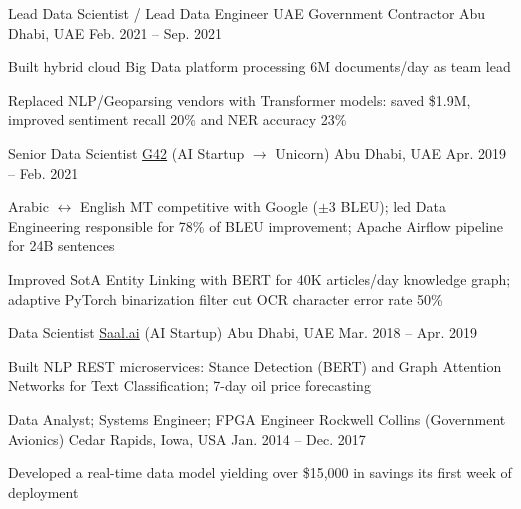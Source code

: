 \begin{cventries}
  \cventry
    {Lead Data Scientist / Lead Data Engineer} %
    {UAE Government Contractor} %
    {Abu Dhabi, UAE} %
    {Feb. 2021 -- Sep. 2021} %
    {
      \begin{cvitems} %
        \item {Built hybrid cloud Big Data platform processing 6M documents/day as team lead}
        \item {Replaced NLP/Geoparsing vendors with Transformer models: saved \$1.9M, improved sentiment recall 20\% and NER accuracy 23\%}
      \end{cvitems}
    }

  \cventry
    {Senior Data Scientist} %
    {\href{https://g42.ai/}{G42} (AI Startup $\rightarrow$ Unicorn)} %
    {Abu Dhabi, UAE} %
    {Apr. 2019 -- Feb. 2021} %
    {
      \begin{cvitems} %
        \item {Arabic $\leftrightarrow$ English MT competitive with Google ($\pm$3 BLEU); led Data Engineering responsible for 78\% of BLEU improvement; Apache Airflow pipeline for 24B sentences}
        \item {Improved SotA Entity Linking with BERT for 40K articles/day knowledge graph; adaptive PyTorch binarization filter cut OCR character error rate 50\%}
      \end{cvitems}
    }

  \cventry
    {Data Scientist} %
    {\href{http://saal.ai/}{Saal.ai} (AI Startup)} %
    {Abu Dhabi, UAE} %
    {Mar. 2018 -- Apr. 2019} %
    {
      \begin{cvitems} %
        \item {Built NLP REST microservices: Stance Detection (BERT) and Graph Attention Networks for Text Classification; 7-day oil price forecasting}
      \end{cvitems}
    }

  \cventry
    {Data Analyst; Systems Engineer; FPGA Engineer} %
    {Rockwell Collins (Government Avionics)} %
    {Cedar Rapids, Iowa, USA} %
    {Jan. 2014 -- Dec. 2017} %
    {
      \begin{cvitems} %
        \item {Developed a real-time data model yielding over \$15,000 in savings its first week of deployment}
      \end{cvitems}
    }

\end{cventries}
